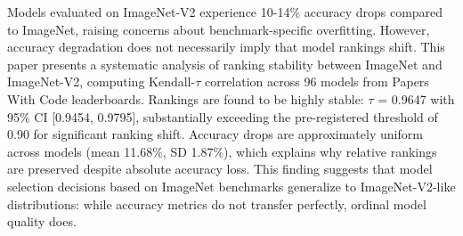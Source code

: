
Models evaluated on ImageNet-V2 experience 10-14\% accuracy drops compared to ImageNet, raising concerns about benchmark-specific overfitting. However, accuracy degradation does not necessarily imply that model rankings shift. This paper presents a systematic analysis of ranking stability between ImageNet and ImageNet-V2, computing Kendall-$\tau$ correlation across 96 models from Papers With Code leaderboards. Rankings are found to be highly stable: $\tau$ = 0.9647 with 95\% CI [0.9454, 0.9795], substantially exceeding the pre-registered threshold of 0.90 for significant ranking shift. Accuracy drops are approximately uniform across models (mean 11.68\%, SD 1.87\%), which explains why relative rankings are preserved despite absolute accuracy loss. This finding suggests that model selection decisions based on ImageNet benchmarks generalize to ImageNet-V2-like distributions: while accuracy metrics do not transfer perfectly, ordinal model quality does.

